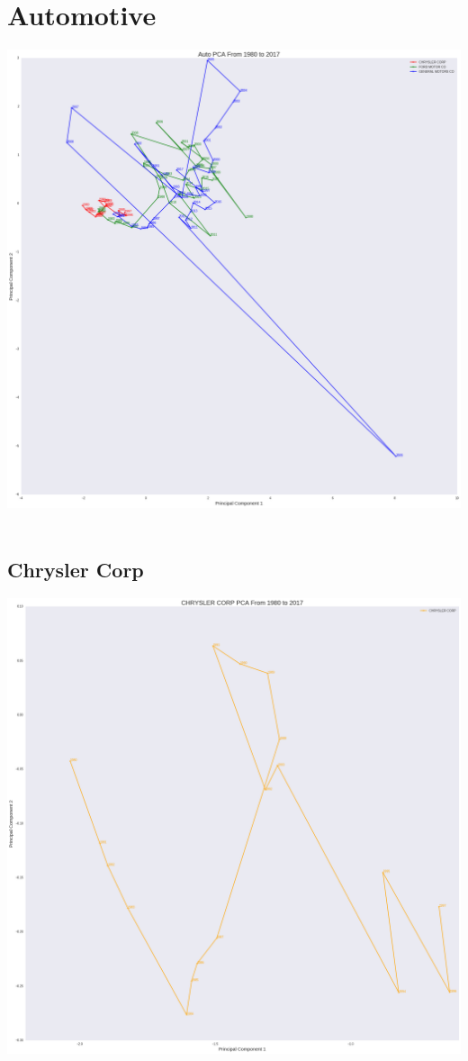 \section{Automotive}
\includegraphics[width=1\textwidth]{./Auto}\\[0.1in] \\
\subsection{Chrysler Corp}
\includegraphics[width=1\textwidth]{./Chrysler}\\[0.1in] \\

